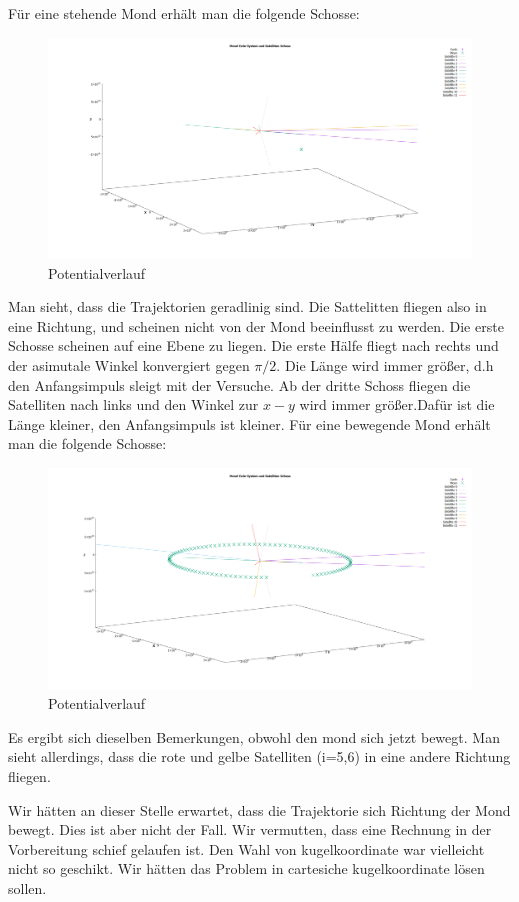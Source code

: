 \documentclass{subfiles}
\begin{document}
    Für eine stehende Mond erhält man die folgende Schosse:
    \begin{figure}[H]
        \centering
        \includegraphics[width=1\textwidth]{../Ressource/Sat_fixeMond.png}
        \caption{Potentialverlauf}
        \label{fig:SatNoMon}
    \end{figure}
   Man sieht, dass die Trajektorien geradlinig sind. Die Sattelitten fliegen also in eine Richtung, und scheinen nicht von der Mond beeinflusst zu werden. 
   Die erste Schosse scheinen auf eine Ebene zu liegen. Die erste Hälfe fliegt nach rechts und der asimutale Winkel konvergiert gegen $\pi/2$. 
   Die Länge wird immer größer, d.h den Anfangsimpuls sleigt mit der Versuche. Ab der dritte Schoss fliegen die Satelliten nach links und den Winkel zur $x-y$ wird immer größer.Dafür ist die Länge kleiner, den Anfangsimpuls ist kleiner.  
    Für eine bewegende Mond erhält man die folgende Schosse:

    \begin{figure}[H]
        \centering
        \includegraphics[width=1\textwidth]{../Ressource/Sat_moveMond.png}
        \caption{Potentialverlauf}
        \label{fig:SatWMon}
    \end{figure}
    Es ergibt sich dieselben Bemerkungen, obwohl den mond sich jetzt bewegt. Man sieht allerdings, dass die rote und gelbe Satelliten (i=5,6) in eine andere Richtung fliegen.\newline

    Wir hätten an dieser Stelle erwartet, dass die Trajektorie sich Richtung der Mond bewegt. Dies ist aber nicht der Fall. 
    Wir vermutten, dass eine Rechnung in der Vorbereitung schief gelaufen ist. Den Wahl von kugelkoordinate war vielleicht nicht so geschikt.
    Wir hätten das Problem in cartesiche kugelkoordinate lösen sollen. 
\end{document}
